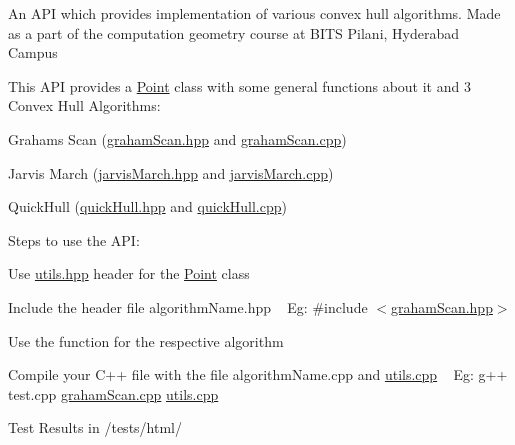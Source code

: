 \label{index_md_Readme}%
%
 An A\+PI which provides implementation of various convex hull algorithms. Made as a part of the computation geometry course at B\+I\+TS Pilani, Hyderabad Campus

This A\+PI provides a \mbox{\hyperlink{class_point}{Point}} class with some general functions about it and 3 Convex Hull Algorithms\+:


\begin{DoxyItemize}
\item Graham\textquotesingle{}s Scan (\mbox{\hyperlink{graham_scan_8hpp}{graham\+Scan.\+hpp}} and \mbox{\hyperlink{graham_scan_8cpp}{graham\+Scan.\+cpp}})
\item Jarvis March (\mbox{\hyperlink{jarvis_march_8hpp}{jarvis\+March.\+hpp}} and \mbox{\hyperlink{jarvis_march_8cpp}{jarvis\+March.\+cpp}})
\item Quick\+Hull (\mbox{\hyperlink{quick_hull_8hpp}{quick\+Hull.\+hpp}} and \mbox{\hyperlink{quick_hull_8cpp}{quick\+Hull.\+cpp}})
\end{DoxyItemize}

Steps to use the A\+PI\+:


\begin{DoxyItemize}
\item Use \mbox{\hyperlink{utils_8hpp}{utils.\+hpp}} header for the \mbox{\hyperlink{class_point}{Point}} class
\item Include the header file algorithm\+Name.\+hpp ~\newline
 Eg\+: \#include $<$\mbox{\hyperlink{graham_scan_8hpp}{graham\+Scan.\+hpp}}$>$
\item Use the function for the respective algorithm
\item Compile your C++ file with the file algorithm\+Name.\+cpp and \mbox{\hyperlink{utils_8cpp}{utils.\+cpp}} ~\newline
 Eg\+: g++ test.\+cpp \mbox{\hyperlink{graham_scan_8cpp}{graham\+Scan.\+cpp}} \mbox{\hyperlink{utils_8cpp}{utils.\+cpp}}
\end{DoxyItemize}

Test Results in /tests/html/ 